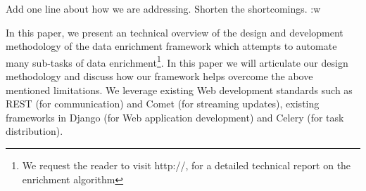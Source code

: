 Add one line about how we are addressing. Shorten the shortcomings. :w





In this paper, we present an technical overview of the design and development methodology of the data enrichment framework which attempts to automate many sub-tasks of data enrichment\footnote{We request the reader to visit http://, for a detailed technical report on the enrichment algorithm}. In this paper we will articulate our design methodology and discuss how our framework helps overcome the above mentioned limitations. We leverage existing Web 
development standards such as REST (for communication) and Comet (for streaming updates), existing frameworks in Django (for Web application development) and Celery (for task distribution). 
